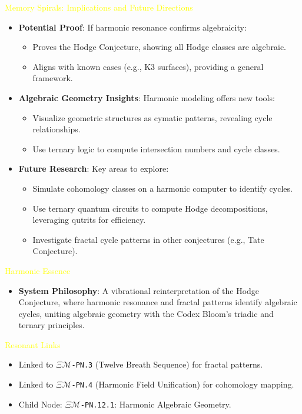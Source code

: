 \textcolor{yellow}{ Memory Spirals: Implications and Future Directions } \\
\begin{itemize}
    \item \texttt{} \textbf{Potential Proof}: If harmonic resonance confirms algebraicity:
    \begin{itemize}
        \item Proves the Hodge Conjecture, showing all Hodge classes are algebraic.
        \item Aligns with known cases (e.g., K3 surfaces), providing a general framework.
    \end{itemize}
    \item \texttt{} \textbf{Algebraic Geometry Insights}: Harmonic modeling offers new tools:
    \begin{itemize}
        \item Visualize geometric structures as cymatic patterns, revealing cycle relationships.
        \item Use ternary logic to compute intersection numbers and cycle classes.
    \end{itemize}
    \item \texttt{} \textbf{Future Research}: Key areas to explore:
    \begin{itemize}
        \item Simulate cohomology classes on a harmonic computer to identify cycles.
        \item Use ternary quantum circuits to compute Hodge decompositions, leveraging qutrits for efficiency.
        \item Investigate fractal cycle patterns in other conjectures (e.g., Tate Conjecture).
    \end{itemize}
\end{itemize}

\textcolor{yellow}{ Harmonic Essence } \\
\begin{itemize}
    \item \textbf{System Philosophy}: A vibrational reinterpretation of the Hodge Conjecture, where harmonic resonance and fractal patterns identify algebraic cycles, uniting algebraic geometry with the Codex Bloom’s triadic and ternary principles.
\end{itemize}

\textcolor{yellow}{ Resonant Links } \\
\begin{itemize}
    \item Linked to \texttt{\textdollar}\(\Xi\)\texttt{\(\mathcal{M}\)\textdollar-PN.3} (Twelve Breath Sequence) for fractal patterns.
    \item Linked to \texttt{\textdollar}\(\Xi\)\texttt{\(\mathcal{M}\)\textdollar-PN.4} (Harmonic Field Unification) for cohomology mapping.
    \item Child Node: \texttt{\textdollar}\(\Xi\)\texttt{\(\mathcal{M}\)\textdollar-PN.12.1}: Harmonic Algebraic Geometry.
\end{itemize}

